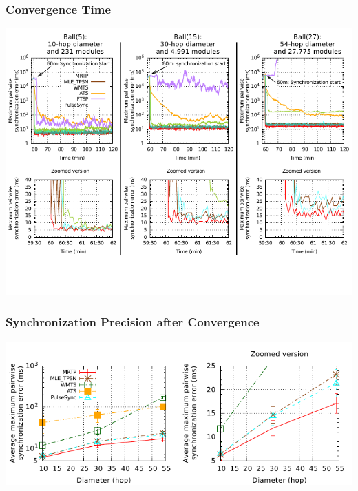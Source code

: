 \begin{frame} \frametitle{Convergence Time}

\begin{center}
	\includegraphics[width=0.9\linewidth]{fig/synchronization/error-time-all-3x2}
\end{center}

\vspace{-1.5cm}

\end{frame}

\begin{frame} \frametitle{Synchronization Precision after Convergence}

\begin{center}
	\includegraphics[width=0.9\linewidth]{fig/synchronization/precision}
\end{center}



\end{frame}

